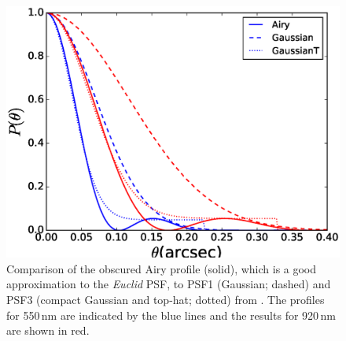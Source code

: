\documentclass[useAMS,usenatbib]{mnras}
\begin{document}
\begin{figure}
\centerline{\includegraphics[width=\hsize]{zairy.eps}}
\caption{Comparison of the obscured Airy profile (solid), which is a good approximation
to the {\it Euclid} PSF, to PSF1 (Gaussian; dashed) and PSF3 (compact Gaussian and 
top-hat; dotted) from . The profiles for 550\,nm are indicated by the blue lines and
the results for 920\,nm are shown in red.}
\label{fig:psfmodel}
\end{figure}
%


%
%
\end{document}

